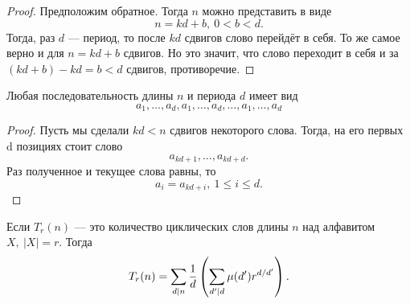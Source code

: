 \begin{proof}
	Предположим обратное. Тогда $n$ можно представить в виде
	\[
		n = kd + b,\ 0 < b < d.
	\]
	Тогда, раз $d$ --- период, то после $kd$ сдвигов слово перейдёт в себя. То же самое верно и для $n = kd + b$ сдвигов. Но это значит, что слово переходит в себя и за $(kd + b) - kd = b < d$ сдвигов, противоречие.
\end{proof}

\begin{lemma}
	Любая последовательность длины $n$ и периода $d$ имеет вид
	\[
		a_1, \ldots, a_d, a_1, \ldots, a_d, \ldots, a_1, \ldots, a_d
	\]
\end{lemma}

\begin{proof}
	Пусть мы сделали $kd < n$ сдвигов некоторого слова. Тогда, на его первых d позициях стоит слово
	\[
		a_{kd + 1}, \ldots, a_{kd + d}.
	\]
	Раз полученное и текущее слова равны, то
	\[
		a_i = a_{kd + i},\ 1 \le i \le d.
	\]
\end{proof}

\begin{theorem}
	Если $T_r(n)$ --- это количество циклических слов длины $n$ над алфавитом $X,\ |X| = r$. Тогда
	\[
		T_r(n) = \sum\limits_{d \mid n} \frac{1}{d} \left(\sum\limits_{d' \mid d} \mu(d') r^{d / d'}\right).
	\]
\end{theorem}